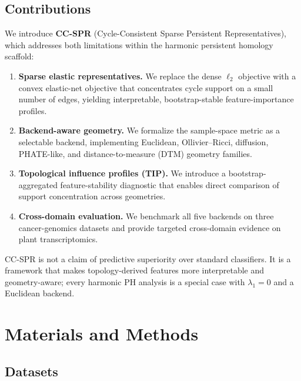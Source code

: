 \documentclass[12pt]{article}
\begin{document}
\subsection{Contributions}

We introduce \textbf{CC-SPR} (Cycle-Consistent Sparse Persistent Representatives), which addresses both limitations within the harmonic persistent homology scaffold:
\begin{enumerate}[leftmargin=1.5em]
\item \textbf{Sparse elastic representatives.} We replace the dense $\ell_2$ objective with a convex elastic-net objective that concentrates cycle support on a small number of edges, yielding interpretable, bootstrap-stable feature-importance profiles.
\item \textbf{Backend-aware geometry.} We formalize the sample-space metric as a selectable backend, implementing Euclidean, Ollivier--Ricci, diffusion, PHATE-like, and distance-to-measure (DTM) geometry families.
\item \textbf{Topological influence profiles (TIP).} We introduce a bootstrap-aggregated feature-stability diagnostic that enables direct comparison of support concentration across geometries.
\item \textbf{Cross-domain evaluation.} We benchmark all five backends on three cancer-genomics datasets and provide targeted cross-domain evidence on plant transcriptomics.
\end{enumerate}

CC-SPR is not a claim of predictive superiority over standard classifiers.
It is a framework that makes topology-derived features more interpretable and geometry-aware; every harmonic PH analysis is a special case with $\lambda_1 = 0$ and a Euclidean backend.


\section{Materials and Methods}
\label{sec:methods}

\subsection{Datasets}
\label{sec:datasets}
\end{document}
